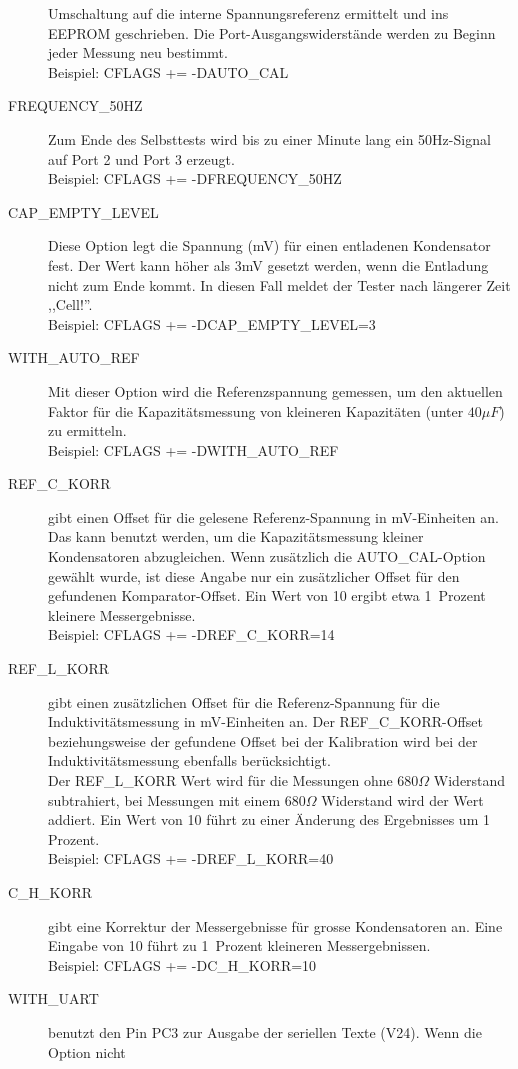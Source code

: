 \begin{description}
Umschaltung auf die interne Spannungsreferenz ermittelt und ins EEPROM geschrieben.
Die Port-Ausgangswiderstände werden zu Beginn jeder Messung neu bestimmt. \\
Beispiel: CFLAGS += -DAUTO\_CAL
  \item[FREQUENCY\_50HZ] Zum Ende des Selbsttests wird bis zu einer Minute lang ein 50Hz-Signal auf Port 2 und Port 3 erzeugt.\\
Beispiel: CFLAGS += -DFREQUENCY\_50HZ
  \item[CAP\_EMPTY\_LEVEL] Diese Option legt die Spannung (mV) für einen entladenen Kondensator fest.
Der Wert kann höher als 3mV gesetzt werden, wenn die Entladung nicht zum Ende kommt. In diesen Fall meldet der Tester nach längerer Zeit ,,Cell!''.\\
Beispiel: CFLAGS += -DCAP\_EMPTY\_LEVEL=3
  \item[WITH\_AUTO\_REF] Mit dieser Option wird die Referenzspannung gemessen, um den aktuellen Faktor für die Kapazitätsmessung 
von kleineren Kapazitäten (unter \(40\mu F\)) zu ermitteln.\\
Beispiel: CFLAGS += -DWITH\_AUTO\_REF
  \item[REF\_C\_KORR] gibt einen Offset für die gelesene Referenz-Spannung in mV-Einheiten an.
Das kann benutzt werden, um die Kapazitätsmessung kleiner Kondensatoren abzugleichen.
Wenn zusätzlich die AUTO\_CAL-Option gewählt wurde, ist diese Angabe nur ein zusätzlicher Offset für
den gefundenen Komparator-Offset.
Ein Wert von 10 ergibt etwa 1~Prozent kleinere Messergebnisse.\\
Beispiel: CFLAGS += -DREF\_C\_KORR=14
  \item[REF\_L\_KORR] gibt einen zusätzlichen Offset für die Referenz-Spannung für die Induktivitätsmessung
in mV-Einheiten an. Der REF\_C\_KORR-Offset beziehungsweise der gefundene Offset bei der Kalibration
wird bei der Induktivitätsmessung ebenfalls berücksichtigt.\\
Der REF\_L\_KORR Wert wird für die Messungen ohne \(680 \Omega\) Widerstand subtrahiert, bei Messungen mit einem
\(680 \Omega\) Widerstand wird der Wert addiert.
Ein Wert von 10 führt zu einer Änderung des Ergebnisses um 1 Prozent.\\
Beispiel: CFLAGS += -DREF\_L\_KORR=40
  \item[C\_H\_KORR] gibt eine Korrektur der Messergebnisse für grosse Kondensatoren an.
Eine Eingabe von 10 führt zu 1~Prozent kleineren Messergebnissen.\\
Beispiel: CFLAGS += -DC\_H\_KORR=10
  \item[WITH\_UART] benutzt den Pin PC3 zur Ausgabe der seriellen Texte (V24). Wenn die Option nicht

\end{description}
